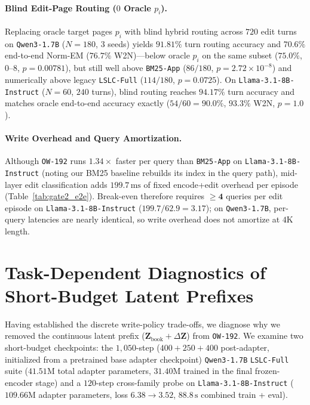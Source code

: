 \documentclass[10pt]{article}
\newcommand{\vect}[1]{\mathbf{#1}}
\renewcommand{\_}{\origunderscore\allowbreak}
\begin{document}
\paragraph{Blind Edit-Page Routing ($0$ Oracle $p_i$).}
Replacing oracle target pages $p_i$ with blind hybrid routing across $720$ edit turns on \texttt{Qwen3-1.7B} ($N=180$, $3$ seeds) yields $91.81\%$ turn routing accuracy and $70.6\%$ end-to-end Norm-EM ($76.7\%$ W2N)---below oracle $p_i$ on the same subset ($75.0\%$, $0$--$8$, $p=0.00781$), but still well above \texttt{BM25-App} ($86/180$, $p=2.72\times 10^{-8}$) and numerically above legacy \texttt{LSLC-Full} ($114/180$, $p=0.0725$). On \texttt{Llama-3.1-8B-Instruct} ($N=60$, $240$ turns), blind routing reaches $94.17\%$ turn accuracy and matches oracle end-to-end accuracy exactly ($54/60 = 90.0\%$, $93.3\%$ W2N, $p=1.0$).

\paragraph{Write Overhead and Query Amortization.}
Although \texttt{OW-192} runs $1.34\times$ faster per query than \texttt{BM25-App} on \texttt{Llama-3.1-8B-Instruct} (noting our BM25 baseline rebuilds its index in the query path), mid-layer edit classification adds $199.7\,\text{ms}$ of fixed encode+edit overhead per episode (Table~\ref{tab:gate2_e2e}). Break-even therefore requires $\mathbf{\ge 4}$ queries per edit episode on \texttt{Llama-3.1-8B-Instruct} ($199.7 / 62.9 = 3.17$); on \texttt{Qwen3-1.7B}, per-query latencies are nearly identical, so write overhead does not amortize at $4\text{K}$ length.

\section{Task-Dependent Diagnostics of Short-Budget Latent Prefixes}
\label{sec:diag}

Having established the discrete write-policy trade-offs, we diagnose why we removed the continuous latent prefix ($\vect{Z}_{\text{book}} + \Delta\vect{Z}$) from \texttt{OW-192}. We examine two short-budget checkpoints: the $1{,}050$-step ($400+250+400$ post-adapter, initialized from a pretrained base adapter checkpoint) \texttt{Qwen3-1.7B} \texttt{LSLC-Full} suite ($41.51\text{M}$ total adapter parameters, $31.40\text{M}$ trained in the final frozen-encoder stage) and a $120$-step cross-family probe on \texttt{Llama-3.1-8B-Instruct} ($109.66\text{M}$ adapter parameters, loss $6.38 \rightarrow 3.52$, $88.8\,\text{s}$ combined train + eval).
\end{document}
